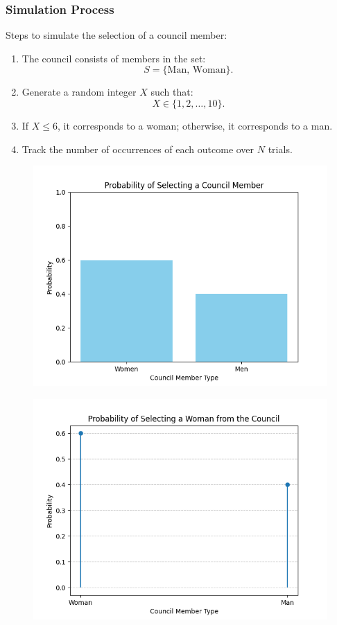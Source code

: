\documentclass{beamer}
\begin{document}
\begin{frame}
\frametitle{Simulation Process}
Steps to simulate the selection of a council member:
\begin{enumerate}
    \item The council consists of members in the set:
    \[
    S = \{\text{Man, Woman}\}.
    \]
    \item Generate a random integer \(X\) such that:
    \[
    X \in \{1, 2, \dots, 10\}.
    \]
    \item If \(X \leq 6\), it corresponds to a woman; otherwise, it corresponds to a man.
    \item Track the number of occurrences of each outcome over \(N\) trials.
\end{enumerate}
\end{frame}
\begin{frame}
\begin{figure}[h!]
   \centering
   \includegraphics[width=\columnwidth]{figs/fig1.png}
   \end{figure}
\end{frame}  
\begin{frame}
\begin{figure}[h!]
   \centering
   \includegraphics[width=\columnwidth]{figs/fig2.png}
   \end{figure}
\end{frame}   
\end{document}
